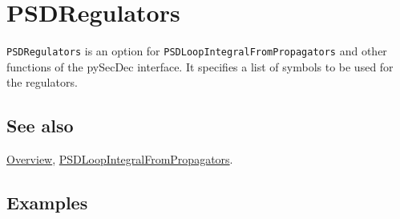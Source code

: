 \documentclass[../FeynHelpersManual.tex]{subfiles}
\begin{document}
\hypertarget{psdregulators}{
\section{PSDRegulators}\label{psdregulators}}

\texttt{PSDRegulators} is an option for
\texttt{PSDLoopIntegralFromPropagators} and other functions of the
pySecDec interface. It specifies a list of symbols to be used for the
regulators.

\subsection{See also}

\hyperlink{toc}{Overview},
\hyperlink{psdloopintegralfrompropagators}{PSDLoopIntegralFromPropagators}.

\subsection{Examples}
\end{document}
